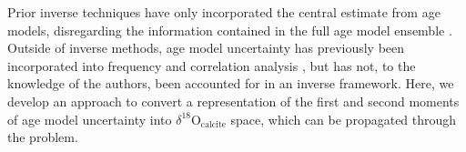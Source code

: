 \documentclass[draft]{agujournal2019}
\begin{document}
Prior inverse techniques have only incorporated the central estimate from age models, disregarding the information contained in the full age model ensemble \cite[]{Burke-Marchal-2011:Application, Gebbie-2012:Tracer, Amrhein-Gebbie-2015:Inferring}. Outside of inverse methods, age model uncertainty has previously been incorporated into frequency and correlation analysis \cite[]{Khider-Emile-Geay-2022:Pyleoclim}, but has not, to the knowledge of the authors, been accounted for in an inverse framework. Here, we develop an approach to convert a representation of the first and second moments of age model uncertainty into $\delta^{18}\mathrm{O}_{\mathrm{calcite}}$ space, which can be propagated through the problem. 


\end{document}
